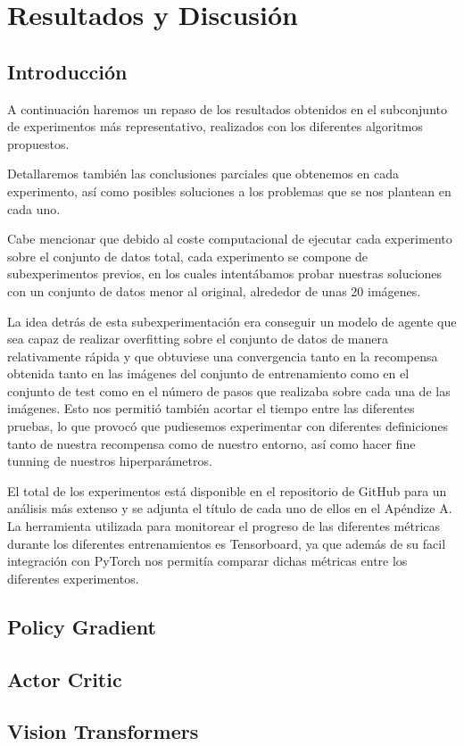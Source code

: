 
\cleardoublepage

\chapter{Resultados y Discusión}
\label{resultados-y-discusion}

\section{Introducción}
\label{resultados-introduccion}

A continuación haremos un repaso de los resultados obtenidos en el subconjunto de experimentos más representativo, realizados con los diferentes algoritmos propuestos.

Detallaremos también las conclusiones parciales que obtenemos en cada experimento, así como posibles soluciones a los problemas que se nos plantean en cada uno.

Cabe mencionar que debido al coste computacional de ejecutar cada experimento sobre el conjunto de datos total, cada experimento se compone de subexperimentos previos, en los cuales intentábamos probar nuestras soluciones con un conjunto de datos menor al original, alrededor de unas 20 imágenes. 

La idea detrás de esta subexperimentación era conseguir un modelo de agente que sea capaz de realizar overfitting sobre el conjunto de datos de manera relativamente rápida y que obtuviese una convergencia tanto en la recompensa obtenida tanto en las imágenes del conjunto de entrenamiento como en el conjunto de test como en el número de pasos que realizaba sobre cada una de las imágenes. Esto nos permitió también acortar el tiempo entre las diferentes pruebas, lo que provocó que pudiesemos experimentar con diferentes definiciones tanto de nuestra recompensa como de nuestro entorno, así como hacer fine tunning de nuestros hiperparámetros.

El total de los experimentos está disponible en el repositorio de GitHub para un análisis más extenso y se adjunta el título de cada uno de ellos en el Apéndize A. La herramienta utilizada para monitorear el progreso de las diferentes métricas durante los diferentes entrenamientos es Tensorboard, ya que además de su facil integración con PyTorch nos permitía comparar dichas métricas entre los diferentes experimentos.


\section{Policy Gradient}
\label{resultados-policy-gradient}

\section{Actor Critic}
\label{resultados-actor-critic}

\section{Vision Transformers}
\label{resultados-vision-transformers}
